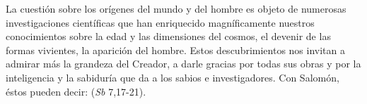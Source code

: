  La cuestión sobre los orígenes del mundo y del hombre es objeto de numerosas investigaciones científicas que han enriquecido magníficamente nuestros conocimientos sobre la edad y las dimensiones del cosmos, el devenir de las formas vivientes, la aparición del hombre. Estos descubrimientos nos invitan a admirar más la grandeza del Creador, a darle gracias por todas sus obras y por la inteligencia y la sabiduría que da a los sabios e investigadores. Con Salomón, éstos pueden decir:  (\emph{Sb} 7,17-21).